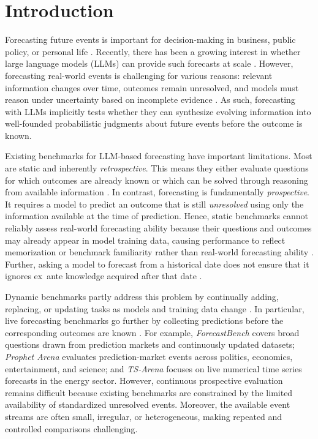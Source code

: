 \documentclass[sigconf,nonacm]{acmart}
\begin{document}
\section{Introduction}

Forecasting future events is important for decision-making in business, public policy, or personal life \cite{hyndmanForecastingPrinciplesPractice2018, PETROPOULOS2022705, hogarthForecastingPlanningEvaluation1981}. Recently, there has been a growing interest in whether large language models (LLMs) can provide such forecasts at scale \citep{autocast,halawi_etal_2024,forecastbench}. However, forecasting real-world events is challenging for various reasons: relevant information changes over time, outcomes remain unresolved, and models must reason under uncertainty based on incomplete evidence \citep{autocastpp,hsieh_etal_2024,gneiting_raftery_2007}. As such, forecasting with LLMs implicitly tests whether they can synthesize evolving information into well-founded probabilistic judgments about future events before the outcome is known.

Existing benchmarks for LLM-based forecasting have important limitations. Most are static and inherently \emph{retrospective}. This means they either evaluate questions for which outcomes are already known \cite{autocastpp, autocast} or which can be solved through reasoning from available information \cite{balunovic_etal_2025_matharena, dynabench, livebench}. In contrast, forecasting is fundamentally \emph{prospective}. It requires a model to predict an outcome that is still \emph{unresolved} using only the information available at the time of prediction. Hence, static benchmarks cannot reliably assess real-world forecasting ability because their questions and outcomes may already appear in model training data, causing performance to reflect memorization \citep{chen_etal_2025_contamination} or benchmark familiarity rather than real-world forecasting ability \cite{livebench, dynabench, dynaboard}. Further, asking a model to forecast from a historical date does not ensure that it ignores ex~ante knowledge acquired after that date \citep{exante}.

Dynamic benchmarks partly address this problem by continually adding, replacing, or updating tasks as models and training data change \citep{dynabench,dynaboard,livebench}. In particular, live forecasting benchmarks go further by collecting predictions before the corresponding outcomes are known \citep{forecastbench,prophetarena,tsarena}. For example, \emph{ForecastBench} \cite{forecastbench} covers broad questions drawn from prediction markets and continuously updated datasets; \emph{Prophet Arena} \cite{prophetarena} evaluates prediction-market events across politics, economics, entertainment, and science; and \emph{TS-Arena} \cite{tsarena} focuses on live numerical time series forecasts in the energy sector. However, continuous prospective evaluation remains difficult because existing benchmarks are constrained by the limited availability of standardized unresolved events. Moreover, the available event streams are often small, irregular, or heterogeneous, making repeated and controlled comparisons challenging.
\end{document}
